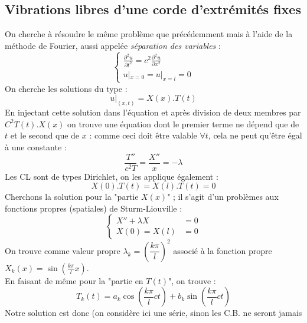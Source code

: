 \documentclass[11pt, a4paper, openany]{book}
\begin{document}
			\subsection{Vibrations libres d'une corde d'extrémités fixes}
			On cherche à résoudre le même problème que précédemment mais à l'aide de la méthode de 
			Fourier, aussi appelée \textit{séparation des variables} :
			\begin{equation}
				\left\{\begin{array}{l}
				\frac{\partial^2u}{\partial t^2} = c^2\frac{\partial^2u}{\partial x^2}\\
				u|_{x=0} = u|_{x=l} = 0
				\end{array}\right.
			\end{equation}
			On cherche les solutions du type :
			\begin{equation}
				u|_{(x,t)} = X(x).T(t)
			\end{equation}
			En injectant cette solution dans l'équation et après division de deux membres par $C^2
			T(t).X(x)$ on trouve une équation dont le premier terme ne dépend que de $t$ et le 
			second que de $x$ : comme ceci doit être valable $\forall t$, cela ne peut qu'être 
			égal à une constante :
			\begin{equation}
				\dfrac{T''}{c^2T} = \dfrac{X''}{x} = -\lambda
			\end{equation}
			Les CL sont de types Dirichlet, on les applique également :
			\begin{equation}
				X(0).T(t) = X(l).T(t) = 0
			\end{equation}
			Cherchons la solution pour la "partie $X(x)$" ; il s'agit d'un problèmes aux fonctions
			propres (spatiales) de Sturm-Liouville :
			\begin{equation}
				\left\{\begin{array}{ll}
				X'' + \lambda X &=0\\
				X(0) = X(l) &=0
				\end{array}\right.
			\end{equation}
			On trouve comme valeur propre $\lambda_k = \left(\dfrac{k\pi}{l}\right)^2$ associé à 
			la fonction propre $X_k(x) = \sin\left(\frac{k\pi}{l}x\right)$.\\
			En faisant de même pour la "partie en $T(t)$", on trouve :
			\begin{equation}
				T_k(t) = a_k\cos\left(\frac{k\pi}{l}ct\right)+b_k\sin\left(\frac{k\pi}{l}ct\right)
			\end{equation}
			Notre solution est donc (on considère ici une série, sinon les C.B. ne seront jamais
\end{document}
